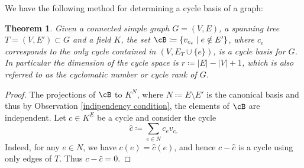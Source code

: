 \documentclass[11pt,a4paper,oneside,openany]{book}
\DeclareMathOperator{\SSpan}{Span}
\newtheorem{theorem}{Theorem}
\numberwithin{definition}{section}
\numberwithin{theorem}{section}
\numberwithin{problem}{section}
\begin{document}
We have the following method for determining a cycle basis of a graph:
\begin{theorem} \label{cycle base theorem}
    Given a connected simple graph $G=(V,E)$, a spanning tree $T= (V,E') \subset G$ and a field $K$, the set $\cB \coloneqq \{v_{c_e} \mid e \notin E' \}$, where $c_e$ corresponds to the only cycle contained in $(V,E_T\cup \{ e \})$, is a cycle basis for $G$. In particular the dimension of the cycle space is $r \coloneqq|E|-|V|+1$, which is also referred to as the \emph{cyclomatic number} or \emph{cycle rank} of $G$.
\end{theorem}
\begin{proof}
    The projections of $\cB$ to $K^{N}$, where $N \coloneqq E \setminus E'$ is the canonical basis and thus by Observation \ref{indipendency condition}, the elements of $\cB$ are independent. Let $c\in K^E$ be a cycle and consider the cycle \[ \hat c \coloneqq \sum_{e \in N} c_e v_{c_e} \] 
    Indeed, for any $e \in N$, we have $c(e) = \hat c(e)$, and hence $c- \hat c$ is a cycle using only edges of $T$. Thus $c -\hat c = 0$.
\end{proof}
\end{document}
